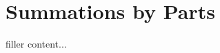 \documentclass[../../templates/section]{subfiles}
\begin{document}
\section{Summations by Parts}\label{sec:summations-by-parts}

filler content...
\end{document}
